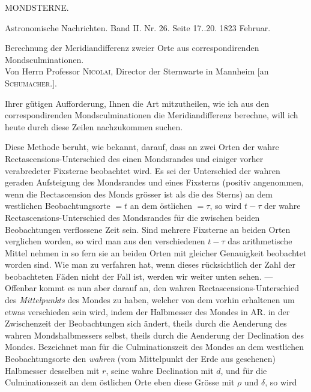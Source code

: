 \clearpage
{}
\hypertarget{native-448-mondsterne}{}
\begin{center}
{\large MONDSTERNE.}
\end{center}

\begin{center}
Astronomische Nachrichten. Band II. Nr. 26. Seite 17..20. 1823 Februar.
\end{center}

\begin{center}
Berechnung der Meridiandifferenz zweier Orte aus correspondirenden Mondsculminationen.\\
Von Herrn Professor \textsc{Nicolai}, Director der Sternwarte in Mannheim [an \textsc{Schumacher.}].
\end{center}

Ihrer gütigen Aufforderung, Ihnen die Art mitzutheilen, wie ich aus den correspondirenden
Mondsculminationen die Meridiandifferenz berechne, will ich heute durch diese Zeilen
nachzukommen suchen.

Diese Methode beruht, wie bekannt, darauf, dass an zwei Orten der wahre
Rectascensions-Unterschied des einen Mondsrandes und einiger vorher verabredeter Fixsterne
beobachtet wird. Es sei der Unterschied der wahren geraden Aufsteigung des Mondsrandes und
eines Fixsterns (positiv angenommen, wenn die Rectascension des Monds grösser ist als die des
Sterns) an dem westlichen Beobachtungsorte $=t$ an dem östlichen $=\tau$, so wird $t-\tau$ der
wahre Rectascensions-Unterschied des Mondsrandes für die zwischen beiden Beobachtungen
verflossene Zeit sein. Sind mehrere Fixsterne an beiden Orten verglichen worden, so wird man
aus den verschiedenen $t-\tau$ das arithmetische Mittel nehmen in so fern sie an beiden Orten
mit gleicher Genauigkeit beobachtet worden sind. Wie man zu verfahren hat, wenn dieses
rücksichtlich der Zahl der beobachteten Fäden nicht der Fall ist, werden wir weiter unten
sehen. --- Offenbar kommt es nun aber darauf an, den wahren Rectascensions-Unterschied des
\emph{Mittelpunkts} des Mondes zu haben, welcher von dem vorhin erhaltenen um etwas
verschieden sein wird, indem der Halbmesser des Mondes in AR. in der Zwischenzeit der
Beobachtungen sich ändert, theils durch die Aenderung des wahren Mondshalbmessers selbst,
theils durch die Aenderung der Declination des Mondes. Bezeichnet man für die Culminationszeit
des Mondes an dem westlichen Beobachtungsorte den \emph{wahren} (vom Mittelpunkt der Erde aus
gesehenen) Halbmesser desselben mit $r$, seine wahre Declination mit $d$, und für die
Culminationszeit an dem östlichen Orte eben diese Grösse mit $\rho$ und $\delta$, so wird


